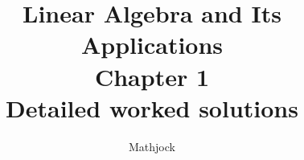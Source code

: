 
\title{\textbf{Linear Algebra and Its Applications}\\[0.3em]Chapter 1\\[0.3em]\large Detailed worked solutions}
\author{Mathjock}
\date{}

\maketitle
\bookinfo
\tableofcontents
\clearpage
\renewcommand{\thesection}{1.\arabic{section}}
\renewcommand{\theHsection}{1.\arabic{section}}
\setcounter{section}{0}

\clearpage
\renewcommand{\thesection}{1.\arabic{section}}
\renewcommand{\theHsection}{1.\arabic{section}}
\setcounter{section}{1}

\clearpage
\renewcommand{\thesection}{1.\arabic{section}}
\renewcommand{\theHsection}{1.\arabic{section}}
\setcounter{section}{2}

\clearpage
\renewcommand{\thesection}{1.\arabic{section}}
\renewcommand{\theHsection}{1.\arabic{section}}
\setcounter{section}{3}

\clearpage
\renewcommand{\thesection}{1.\arabic{section}}
\renewcommand{\theHsection}{1.\arabic{section}}
\setcounter{section}{4}

\clearpage
\renewcommand{\thesection}{1.\arabic{section}}
\renewcommand{\theHsection}{1.\arabic{section}}
\setcounter{section}{5}

\clearpage
\renewcommand{\thesection}{1.\arabic{section}}
\renewcommand{\theHsection}{1.\arabic{section}}
\setcounter{section}{6}

\clearpage
\renewcommand{\thesection}{1.\arabic{section}}
\renewcommand{\theHsection}{1.\arabic{section}}
\setcounter{section}{7}

\clearpage
\renewcommand{\thesection}{1.\arabic{section}}
\renewcommand{\theHsection}{1.\arabic{section}}
\setcounter{section}{8}

\clearpage
\renewcommand{\thesection}{1.\arabic{section}}
\renewcommand{\theHsection}{1.\arabic{section}}
\setcounter{section}{9}

\clearpage
\renewcommand{\thesection}{1.S}
\renewcommand{\theHsection}{1.S}
\setcounter{section}{0}


